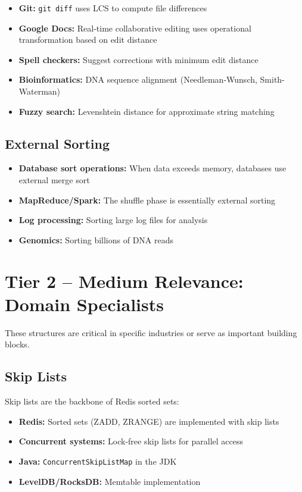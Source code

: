 \begin{itemize}
    \item \textbf{Git:} \texttt{git diff} uses LCS to compute file differences
    \item \textbf{Google Docs:} Real-time collaborative editing uses operational transformation based on edit distance
    \item \textbf{Spell checkers:} Suggest corrections with minimum edit distance
    \item \textbf{Bioinformatics:} DNA sequence alignment (Needleman-Wunsch, Smith-Waterman)
    \item \textbf{Fuzzy search:} Levenshtein distance for approximate string matching
\end{itemize}

\subsection{External Sorting}

\begin{itemize}
    \item \textbf{Database sort operations:} When data exceeds memory, databases use external merge sort
    \item \textbf{MapReduce/Spark:} The shuffle phase is essentially external sorting
    \item \textbf{Log processing:} Sorting large log files for analysis
    \item \textbf{Genomics:} Sorting billions of DNA reads
\end{itemize}


\section{Tier 2 -- Medium Relevance: Domain Specialists}

These structures are critical in specific industries or serve as important building blocks.

\subsection{Skip Lists}

Skip lists are the backbone of Redis sorted sets:
\begin{itemize}
    \item \textbf{Redis:} Sorted sets (ZADD, ZRANGE) are implemented with skip lists
    \item \textbf{Concurrent systems:} Lock-free skip lists for parallel access
    \item \textbf{Java:} \texttt{ConcurrentSkipListMap} in the JDK
    \item \textbf{LevelDB/RocksDB:} Memtable implementation
\end{itemize}


